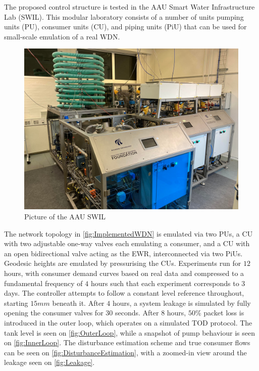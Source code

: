 The proposed control structure is tested in the AAU Smart Water Infrastructure Lab (SWIL). This modular laboratory consists of a number of units pumping units (PU), consumer units (CU), and piping units (PiU) that can be used for small-scale emulation of a real WDN.

\begin{figure}[h!]
	\includegraphics[width=\linewidth]{Pictures/SWIL.pdf}
	\caption{Picture of the AAU SWIL}
	\label{fig:AAUSWIL}
\end{figure}

The network topology in \cref{fig:ImplementedWDN} is emulated via two PUs, a CU with two adjustable one-way valves each emulating a consumer, and a CU with an open bidirectional valve acting as the EWR, interconnected via two PiUs. Geodesic heights are emulated by pressurising the CUs. Experiments run for $12$ hours, with consumer demand curves based on real data and compressed to a fundamental frequency of $4$ hours such that each experiment corresponds to $3$ days. The controller attempts to follow a constant level reference throughout, starting $15 \si{mm}$ beneath it. After $4$ hours, a system leakage is simulated by fully opening the consumer valves for $30$ seconds. After $8$ hours, $50\%$ packet loss is introduced in the outer loop, which operates on a simulated TOD protocol. The tank level is seen on \cref{fig:OuterLoop}, while a snapshot of pump behaviour is seen on \cref{fig:InnerLoop}. The disturbance estimation scheme and true consumer flows can be seen on \cref{fig:DisturbanceEstimation}, with a zoomed-in view around the leakage seen on \cref{fig:Leakage}.


